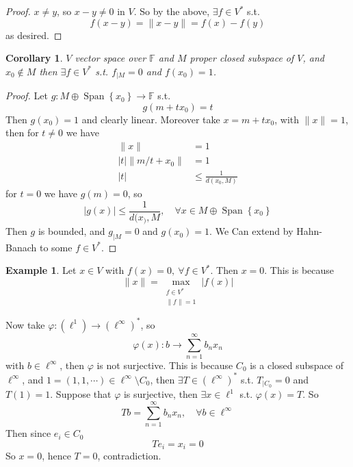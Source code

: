 \documentclass[11pt,a4paper]{article}
\theoremstyle{definition}
\newtheorem{example}[definition]{Example}
\theoremstyle{plain}
\newtheorem{corollary}[definition]{Corollary}
\theoremstyle{remark}
\newcommand{\F}{\mathbb{F}}
\renewcommand{\set}[1]{\left\{ #1 \right\}}
\newcommand{\abs}[1]{\lvert #1 \rvert}
\newcommand{\norm}[1]{\lVert #1 \rVert}
\newcommand{\1}{\mathbbm{1}}
\newcommand{\Span}{\operatorname{Span}}
\begin{document}
\begin{proof}
    $x \ne y$, so $x-y \ne 0$ in $V$. So by the above, $\exists f \in V^*$ s.t. 
    $$f(x-y) = \norm{x-y} = f(x) - f(y)$$
    as desired.
\end{proof}

\begin{corollary}
    $V$ vector space over $\F$ and $M$ proper closed subspace of $V$, and $x_0 \not\in M$ then $\exists f \in V^*$ s.t. $f_{|M} = 0$ and $f(x_0) = 1$.
\end{corollary}

\begin{proof}
    Let $g \colon M \oplus \Span \set{x_0} \to \F$ s.t. 
    $$g(m + tx_0) = t$$
    Then $g(x_0) = 1$ and clearly linear. Moreover take $x = m + tx_0$, with $\norm{x} = 1$, then for $t \ne 0$ we have 
    \begin{align*}
        \norm{x} &= 1 \\
        \abs{t} \norm{m/t + x_0} &= 1 \\
        \abs{t} &\le \frac{1}{d(x_0, M)}
    \end{align*} 
    for $t = 0$ we have $g(m) = 0$, so 
    $$\abs{g(x)} \le \frac{1}{d(x_), M}, \quad \forall x \in M \oplus \Span \set{x_0}$$
    Then $g$ is bounded, and $g_{|M} = 0$ and $g(x_0) = 1$. We Can extend by Hahn-Banach to some $f \in V^*$. 
\end{proof}

\begin{example}
    Let $x \in V$ with $f(x) = 0, \ \forall f \in V^*$. Then $x=0$. This is because 
    $$\norm{x} = \max_{\substack{f \in V^* \\ \norm{f} = 1}} \abs{f(x)}$$

    Now take $\varphi \colon (\ell^1) \to (\ell^\infty)^*$, so 
    $$\varphi(x) \colon b \to \sum_{n=1}^\infty b_n x_n$$
    with $b \in \ell^\infty$, then $\varphi$ is not surjective. This is because $C_0$ is a closed subspace of $\ell^\infty$, and $1 = (1,1,\cdots) \in \ell^\infty \setminus C_0$, 
    then $\exists T \in (\ell^\infty)^*$ s.t. $T_{|C_0} = 0$ and $T(1)= 1$. Suppose that $\varphi$ is surjective, then $\exists x \in \ell^1$ s.t. $\varphi(x) = T$. 
    So 
    $$Tb = \sum_{n=1}^\infty b_n x_n, \quad \forall b \in \ell^\infty$$
    Then since $e_i \in C_0$
    $$Te_i = x_i = 0$$
    So $x = 0$, hence $T = 0$, contradiction.
\end{example}
\end{document}

